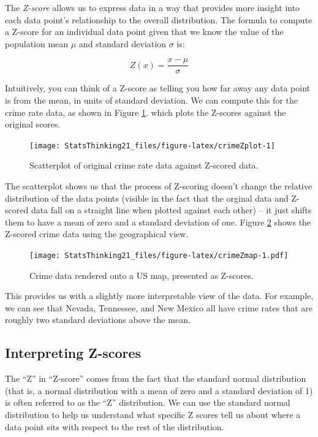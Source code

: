 \documentclass[12pt,]{book}
\theoremstyle{definition}
\theoremstyle{definition}
\theoremstyle{definition}
\theoremstyle{remark}
\begin{document}
The \emph{Z-score} allows us to express data in a way that provides more insight into each data point's relationship to the overall distribution. The formula to compute a Z-score for an individual data point given that we know the value of the population mean \(\mu\) and standard deviation \(\sigma\) is:

\[
Z(x) = \frac{x - \mu}{\sigma}
\]

Intuitively, you can think of a Z-score as telling you how far away any data point is from the mean, in units of standard deviation. We can compute this for the crime rate data, as shown in Figure \ref{fig:crimeZplot}. which plots the Z-scores against the original scores.

\begin{figure}
\texttt{[image: StatsThinking21\_files/figure-latex/crimeZplot-1]} \caption{Scatterplot of original crime rate data against Z-scored data.}\label{fig:crimeZplot}
\end{figure}

The scatterplot shows us that the process of Z-scoring doesn't change the relative distribution of the data points (visible in the fact that the orginal data and Z-scored data fall on a straight line when plotted against each other) -- it just shifts them to have a mean of zero and a standard deviation of one. Figure \ref{fig:crimeZmap} shows the Z-scored crime data using the geographical view.

\begin{figure}
\centering
\texttt{[image: StatsThinking21\_files/figure-latex/crimeZmap-1.pdf]}
\caption{\label{fig:crimeZmap}Crime data rendered onto a US map, presented as Z-scores.}
\end{figure}

This provides us with a slightly more interpretable view of the data. For example, we can see that Nevada, Tennessee, and New Mexico all have crime rates that are roughly two standard deviations above the mean.

\hypertarget{interpreting-z-scores}{%
\subsection{Interpreting Z-scores}\label{interpreting-z-scores}}

The ``Z'' in ``Z-score'' comes from the fact that the standard normal distribution (that is, a normal distribution with a mean of zero and a standard deviation of 1) is often referred to as the ``Z'' distribution. We can use the standard normal distribution to help us understand what specific Z scores tell us about where a data point sits with respect to the rest of the distribution.
\end{document}
